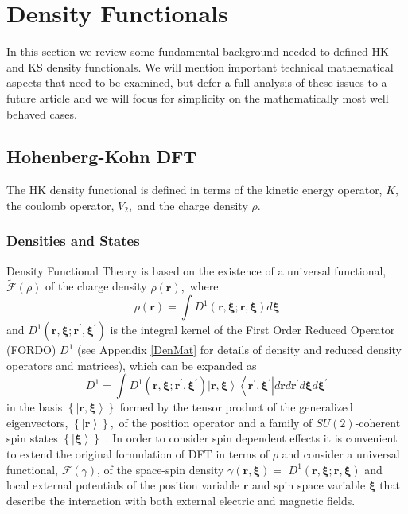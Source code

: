 \documentclass[aps,preprint]{revtex4}%
\begin{document}
\section{Density Functionals \label{Standard}}

In this section we review some fundamental background needed to defined HK and
KS density functionals. We will mention important technical mathematical
aspects that need to be examined, but defer a full analysis of these issues to
a future article and we will focus for simplicity on the mathematically most
well behaved cases.

\subsection{Hohenberg-Kohn DFT}

The HK density functional is defined in terms of the kinetic energy operator,
$K,$ the coulomb operator, $V_{2},$ and the charge density $\rho$.

\subsubsection{Densities and States}

Density Functional Theory is based on the existence of a universal functional,
$\mathcal{\tilde{F}}\left(  \rho\right)  $ \cite{HK} of the charge density
$\rho\left(  \boldsymbol{r}\right)  ,$ where
\begin{equation}
\rho\left(  \boldsymbol{r}\right)  =\int D^{1}\left(  \boldsymbol{r,\xi;r,\xi
}\right)  d\boldsymbol{\xi}%
\end{equation}
and $D^{1}\left(  \boldsymbol{r,\xi;r}^{\prime}\boldsymbol{,\xi}^{\prime
}\right)  $ is the integral kernel of the First Order Reduced Operator (FORDO)
$D^{1}$ \cite{Coleman} (see Appendix \ref{DenMat} for details of density and
reduced density operators and matrices), which can be expanded as
\begin{equation}
D^{1}=\int D^{1}\left(  \boldsymbol{r,\xi;r}^{\prime}\boldsymbol{,\xi}%
^{\prime}\right)  \left\vert \boldsymbol{r,\xi}\right\rangle \left\langle
\boldsymbol{r}^{\prime}\boldsymbol{,\xi}^{\prime}\right\vert d\boldsymbol{r}%
d\boldsymbol{r}^{\prime}d\boldsymbol{\xi}d\boldsymbol{\xi}^{\prime}%
\end{equation}
in the basis $\left\{  \left\vert \boldsymbol{r,\xi}\right\rangle \right\}  $
formed by the tensor product of the generalized eigenvectors, $\left\{
\left\vert \boldsymbol{r}\right\rangle \right\}  ,$ of the position operator
and a family of $SU(2)$-coherent spin states $\left\{  \left\vert
\boldsymbol{\xi}\right\rangle \right\}  $ \cite{weiner2005}. In order to
consider spin dependent effects it is convenient to extend the original
formulation of DFT in terms of $\rho$ and consider a universal functional,
$\mathcal{F}\left(  \gamma\right)  $, of the space-spin density $\gamma\left(
\boldsymbol{r,\xi}\right)  =$ $D^{1}\left(  \boldsymbol{r,\xi;r,\xi}\right)  $
\cite{weiner-trickey} and local external potentials of the position variable
$\boldsymbol{r}$ and spin space variable $\boldsymbol{\xi}$ that describe the
interaction with both external electric and magnetic fields.
\end{document}
